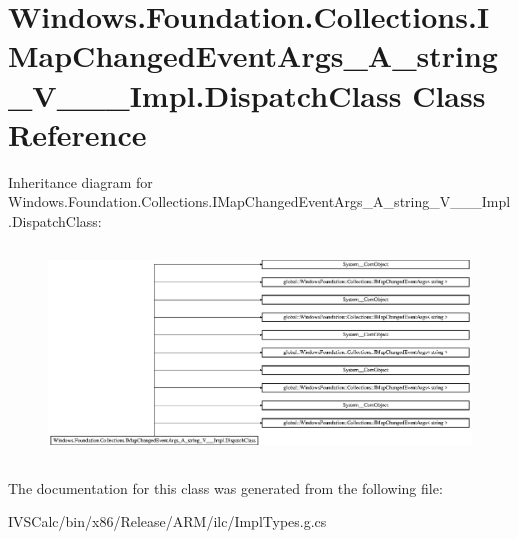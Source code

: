 \hypertarget{class_windows_1_1_foundation_1_1_collections_1_1_i_map_changed_event_args___a__string___v_______impl_1_1_dispatch_class}{}\section{Windows.\+Foundation.\+Collections.\+I\+Map\+Changed\+Event\+Args\+\_\+\+A\+\_\+string\+\_\+\+V\+\_\+\+\_\+\+\_\+\+Impl.\+Dispatch\+Class Class Reference}
\label{class_windows_1_1_foundation_1_1_collections_1_1_i_map_changed_event_args___a__string___v_______impl_1_1_dispatch_class}
Inheritance diagram for Windows.\+Foundation.\+Collections.\+I\+Map\+Changed\+Event\+Args\+\_\+\+A\+\_\+string\+\_\+\+V\+\_\+\+\_\+\+\_\+\+Impl.\+Dispatch\+Class\+:\begin{figure}[H]
\begin{center}
\leavevmode
\includegraphics[height=5.682656cm]{class_windows_1_1_foundation_1_1_collections_1_1_i_map_changed_event_args___a__string___v_______impl_1_1_dispatch_class}
\end{center}
\end{figure}


The documentation for this class was generated from the following file\+:\begin{DoxyCompactItemize}
\item 
I\+V\+S\+Calc/bin/x86/\+Release/\+A\+R\+M/ilc/Impl\+Types.\+g.\+cs\end{DoxyCompactItemize}
